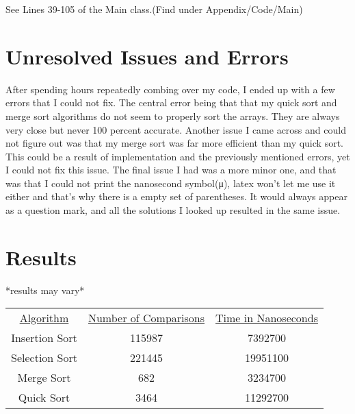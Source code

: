\documentclass[10pt]{article}
\begin{document}
See Lines 39-105 of the Main class.(Find under Appendix/Code/Main)


\section{Unresolved Issues and Errors}
After spending hours repeatedly combing over my code, I ended up with a few errors that I could not fix. The central error being that that my quick sort and merge sort algorithms do not seem to properly sort the arrays. They are always very close but never 100 percent accurate. Another issue I came across and could not figure out was that my merge sort was far more efficient than my quick sort. This could be a result of implementation and the previously mentioned errors, yet I could not fix this issue. The final issue I had was a more minor one, and that was that I could not print the nanosecond symbol(μ), latex won't let me use it either and that's why there is a empty set of parentheses. It would always appear as a question mark, and all the solutions I looked up resulted in the same issue.


\section{Results}
*results may vary*
\begin{center}
\begin{tabular}{ |c|c|c| } 
 \hline
 \underline{Algorithm} & \underline{Number of Comparisons} & \underline{Time in Nanoseconds} \\
 Insertion Sort & 115987 & 7392700 \\ 
 Selection Sort & 221445 & 19951100 \\ 
 Merge Sort     & 682 & 3234700 \\ 
 Quick Sort     & 3464 & 11292700 \\ 
 \hline
\end{tabular}
\end{center}


 
\end{document}
